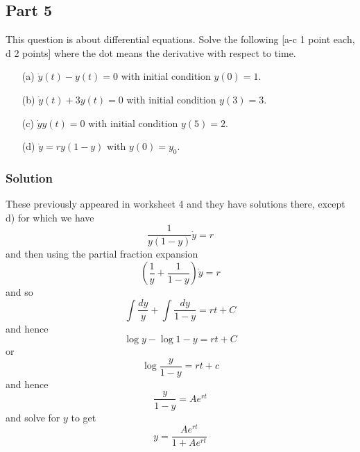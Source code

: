 \documentclass[11pt,a4paper]{scrartcl}
\begin{document}
\subsection*{Part 5}
This question is about differential equations. Solve the following [a-c 1 point each, d 2 points] where the dot means the derivative with respect to time.
	\begin{itemize}
		\item[(a)] $\dot{y}(t) - y(t) = 0$ with initial condition $y(0) = 1$.
		\item[(b)] $\dot{y}(t) + 3y(t) = 0$ with initial condition $y(3) = 3$.
		\item[(c)] $\dot{y}y(t) = 0$ with  initial condition $y(5) = 2$.
                  \item[(d)] $\dot{y}=ry(1-y)$ with $y(0)=y_0$. 
	\end{itemize}


\subsubsection*{Solution}
These previously appeared in worksheet 4 and they have solutions there, except d) for which we have
\begin{equation}
  \frac{1}{y(1-y)} \dot{y}=r
\end{equation}
and then using the partial fraction expansion
\begin{equation}
  \left(\frac{1}{y}+\frac{1}{1-y}\right)\dot{y}=r
\end{equation}
and so
\begin{equation}
  \int{\frac{dy}{y}}+\int{\frac{dy}{1-y}}=rt+C
\end{equation}
and hence
\begin{equation}
  \log{y}-\log{1-y}=rt+C
\end{equation}
or
\begin{equation}
  \log{\frac{y}{1-y}}=rt+c
\end{equation}
and hence
\begin{equation}
  \frac{y}{1-y}=Ae^{rt}
\end{equation}
and solve for $y$ to get
\begin{equation}
  y=\frac{Ae^{rt}}{1+Ae^{rt}}
  \end{equation}
\end{document}
